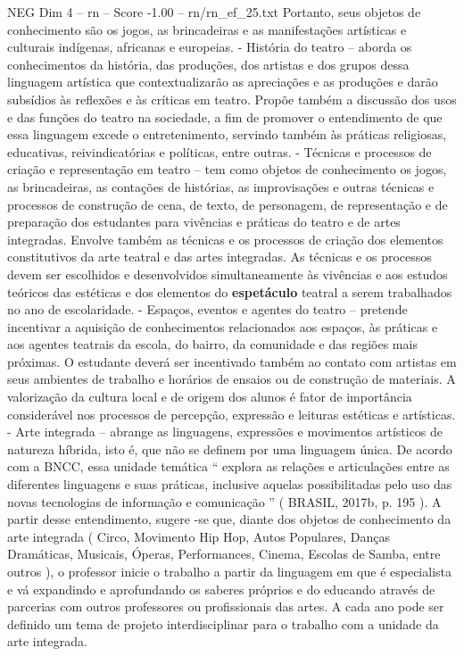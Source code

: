 \begin{textsample}{NEG Dim 4 – rn – Score -1.00 – rn/rn\_ef\_25.txt}
Portanto, seus objetos de conhecimento são os jogos, as brincadeiras e as manifestações artísticas e culturais indígenas, africanas e europeias. - História do teatro – aborda os conhecimentos da história, das produções, dos artistas e dos grupos dessa linguagem artística que contextualizarão as apreciações e as produções e darão subsídios às reflexões e às críticas em teatro.
Propõe também a discussão dos usos e das funções do teatro na sociedade, a fim de promover o entendimento de que essa linguagem excede o entretenimento, servindo também às práticas religiosas, educativas, reivindicatórias e políticas, entre outras. - Técnicas e processos de criação e representação em teatro – tem como objetos de conhecimento os jogos, as brincadeiras, as contações de histórias, as improvisações e outras técnicas e processos de construção de cena, de texto, de personagem, de representação e de preparação dos estudantes para vivências e práticas do teatro e de artes integradas.
Envolve também as técnicas e os processos de criação dos elementos constitutivos da arte teatral e das artes integradas.
As técnicas e os processos devem ser escolhidos e desenvolvidos simultaneamente às vivências e aos estudos teóricos das estéticas e dos elementos do \textbf{espetáculo} teatral a serem trabalhados no ano de escolaridade. - Espaços, eventos e agentes do teatro – pretende incentivar a aquisição de conhecimentos relacionados aos espaços, às práticas e aos agentes teatrais da escola, do bairro, da comunidade e das regiões mais próximas.
O estudante deverá ser incentivado também ao contato com artistas em seus ambientes de trabalho e horários de ensaios ou de construção de materiais.
A valorização da cultura local e de origem dos alunos é fator de importância considerável nos processos de percepção, expressão e leituras estéticas e artísticas. - Arte integrada – abrange as linguagens, expressões e movimentos artísticos de natureza híbrida, isto é, que não se definem por uma linguagem única.
De acordo com a BNCC, essa unidade temática “ explora as relações e articulações entre as diferentes linguagens e suas práticas, inclusive aquelas possibilitadas pelo uso das novas tecnologias de informação e comunicação ” ( BRASIL, 2017b, p. 195 ).
A partir desse entendimento, sugere -se que, diante dos objetos de conhecimento da arte integrada ( Circo, Movimento Hip Hop, Autos Populares, Danças Dramáticas, Musicais, Óperas, Performances, Cinema, Escolas de Samba, entre outros ), o professor inicie o trabalho a partir da linguagem em que é especialista e vá expandindo e aprofundando os saberes próprios e do educando através de parcerias com outros professores ou profissionais das artes.
A cada ano pode ser definido um tema de projeto interdisciplinar para o trabalho com a unidade da arte integrada.

\end{textsample}
